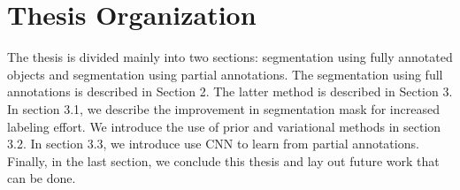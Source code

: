 \section{Thesis Organization}
The thesis is divided mainly into two sections: segmentation using fully annotated objects and segmentation using partial annotations. The segmentation using full annotations is described in Section 2. The latter method is described in Section 3. In section 3.1, we describe the improvement in segmentation mask for increased labeling effort. We introduce the use of prior and variational methods in section 3.2. In section 3.3, we introduce use CNN to learn from partial annotations. Finally, in the last section, we conclude this thesis and lay out future work that can be done.


